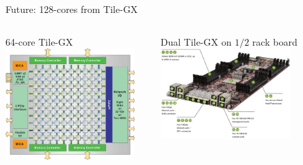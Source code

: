 \documentclass[xcolor=dvipsnames,beamer]{beamer} %
\begin{document}
\begin{frame}[fragile]{Future: 128-cores from Tile-GX}

\begin{columns}[l]
\begin{center}
 64-core Tile-GX\newline\linebreak
 \includegraphics[width=5cm]{TILE-Gx_Block_Diagram_large}
\end{center}
\begin{center}
 Dual Tile-GX on {\small $1/2$} rack board\newline\linebreak
 \includegraphics[width=5cm]{tilera_quanta_sq2_mobo}
\end{center}

\end{columns}

\end{frame}
\end{document}

